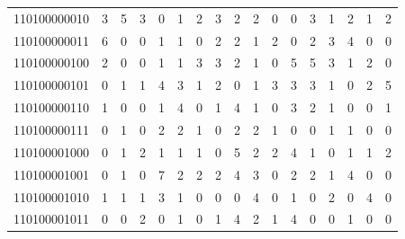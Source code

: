 \documentclass[10pt,a4paper]{article}
\begin{document}
\begin{longtable}{ |c|c|c|c|c|c|c|c|c|c|c|c|c|c|c|c|c| }
    110100000010              & 3                            & 5                                & 3                            & 0                              & 1   & 2   & 3   & 2   & 2   & 0   & 0   & 3   & 1   & 2   & 1   & 2   \\
    110100000011              & 6                            & 0                                & 0                            & 1                              & 1   & 0   & 2   & 2   & 1   & 2   & 0   & 2   & 3   & 4   & 0   & 0   \\
    110100000100              & 2                            & 0                                & 0                            & 1                              & 1   & 3   & 3   & 2   & 1   & 0   & 5   & 5   & 3   & 1   & 2   & 0   \\
    110100000101              & 0                            & 1                                & 1                            & 4                              & 3   & 1   & 2   & 0   & 1   & 3   & 3   & 3   & 1   & 0   & 2   & 5   \\
    110100000110              & 1                            & 0                                & 0                            & 1                              & 4   & 0   & 1   & 4   & 1   & 0   & 3   & 2   & 1   & 0   & 0   & 1   \\
    110100000111              & 0                            & 1                                & 0                            & 2                              & 2   & 1   & 0   & 2   & 2   & 1   & 0   & 0   & 1   & 1   & 0   & 0   \\
    110100001000              & 0                            & 1                                & 2                            & 1                              & 1   & 1   & 0   & 5   & 2   & 2   & 4   & 1   & 0   & 1   & 1   & 2   \\
    110100001001              & 0                            & 1                                & 0                            & 7                              & 2   & 2   & 2   & 4   & 3   & 0   & 2   & 2   & 1   & 4   & 0   & 0   \\
    110100001010              & 1                            & 1                                & 1                            & 3                              & 1   & 0   & 0   & 0   & 4   & 0   & 1   & 0   & 2   & 0   & 4   & 0   \\
    110100001011              & 0                            & 0                                & 2                            & 0                              & 1   & 0   & 1   & 4   & 2   & 1   & 4   & 0   & 0   & 1   & 0   & 0   \\

\end{longtable}
\end{document}
